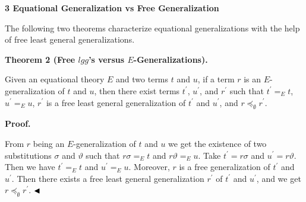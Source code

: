 \documentclass[10pt,a4paper]{amsart}
\begin{document}
 
 


 
\par\medskip\noindent\textbf{3 Equational Generalization vs Free Generalization}\par
 
 
The following two theorems characterize equational generalizations with the help of free least general generalizations.\par
 
 
 
\par\medskip\noindent\textbf{Theorem 2 (Free $\mathit{lgg}$’s versus $E$-Generalizations).}\par
 
 
Given an equational theory $E$ and two terms $t$ and $u$, if a term $r$ is an $E$-generalization of $t$ and $u$, then there exist terms $t^{\prime}$, $u^{\prime}$, and $r^{\prime}$ such that $t^{\prime}=_{E}t$, $u^{\prime}=_{E}u$, $r^{\prime}$ is a free least general generalization of $t^{\prime}$ and $u^{\prime}$, and $r\preceq_{\emptyset}r^{\prime}$.\par
 
 
 
 
\par\medskip\noindent\textbf{Proof.}\par
 
 
From $r$ being an $E$-generalization of $t$ and $u$ we get the existence of two substitutions $\sigma$ and $\vartheta$ such that $r\sigma=_{E}t$ and $r\vartheta=_{E}u$. Take $t^{\prime}=r\sigma$ and $u^{\prime}=r\vartheta$. Then we have $t^{\prime}=_{E}t$ and $u^{\prime}=_{E}u$. Moreover, $r$ is a free generalization of $t^{\prime}$ and $u^{\prime}$. Then there exists a free least general generalization $r^{\prime}$ of $t^{\prime}$ and $u^{\prime}$, and we get $r\preceq_{\emptyset}r^{\prime}$. $\hfill\blacktriangleleft$\par
 
 
\end{document}
